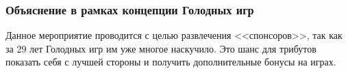 
\subsubsection*{Объяснение в рамках концепции Голодных игр}
\par Данное мероприятие проводится с целью развлечения <<спонсоров>>, так как за 29 лет Голодных игр им уже многое наскучило. Это шанс для трибутов показать себя с лучшей стороны и получить дополнительные бонусы на играх.

